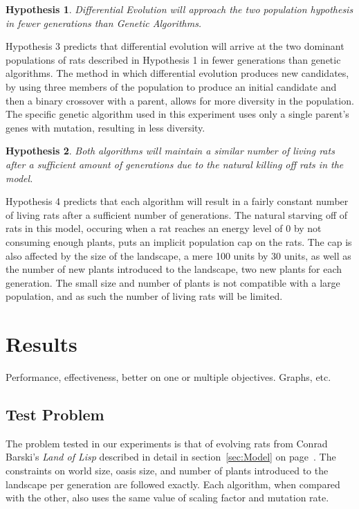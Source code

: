 \documentclass{sig-alternate}
\newtheorem{hyp}{Hypothesis}
\begin{document}
\begin{hyp}
\begin{minipage}[t]{2.2 in}
Differential Evolution will approach the two population hypothesis in fewer generations than Genetic Algorithms.
\label{hyp:defaster}
\end{minipage}
\end{hyp}

Hypothesis 3 predicts that differential evolution will arrive at the two dominant populations of rats described in Hypothesis 1 in fewer generations than genetic algorithms.  The method in which differential evolution produces new candidates, by using three members of the population to produce an initial candidate and then a binary crossover with a parent, allows for more diversity in the population.  The specific genetic algorithm used in this experiment uses only a single parent's genes with mutation, resulting in less diversity.

\begin{hyp}
\begin{minipage}[t]{2.2 in}
Both algorithms will maintain a similar number of living rats after a sufficient amount of generations due to the natural killing off rats in the model.
\label{hyp:livingrats}
\end{minipage}
\end{hyp}

Hypothesis 4 predicts that each algorithm will result in a fairly constant number of living rats after a sufficient number of generations.  The natural starving off of rats in this model, occuring when a rat reaches an energy level of 0 by not consuming enough plants, puts an implicit population cap on the rats.  The cap is also affected by the size of the landscape, a mere 100 units by 30 units, as well as the number of new plants introduced to the landscape, two new plants for each generation.\cite{LOL}  The small size and number of plants is not compatible with a large population, and as such the number of living rats will be limited.

\section{Results}
\label{sec:results}
Performance, effectiveness, better on one or multiple
objectives.  Graphs, etc.

\subsection{Test Problem}
The problem tested in our experiments is that of evolving rats from Conrad Barski's \emph{Land of Lisp} described in detail in section~\ref{sec:Model} on page~\pageref{sec:Model}.  The constraints on world size, oasis size, and number of plants introduced to the landscape per generation are followed exactly.  Each algorithm, when compared with the other, also uses the same value of scaling factor and mutation rate.
\end{document}

